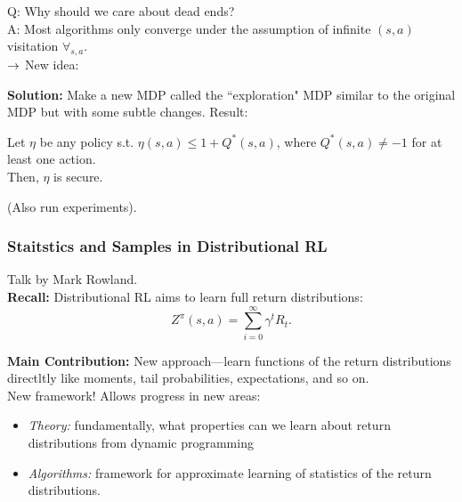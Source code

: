
Q: Why should we care about dead ends? \\

A: Most algorithms only converge under the assumption of infinite $(s,a)$ visitation $\forall_{s,a}$. \\

$\rightarrow$ New idea:

{\bf Solution:} Make a new MDP called the ``exploration" MDP similar to the original MDP but with some subtle changes. Result:
\begin{theorem}
Let $\eta$ be any policy s.t. $\eta(s,a) \leq 1+ Q^*(s,a)$, where $Q^*(s,a) \neq -1$ for at least one action. \\

Then, $\eta$ is secure.
\end{theorem}

(Also run experiments). \\


\spacerule
\subsubsection{Staitstics and Samples in Distributional RL}

Talk by Mark Rowland. \\

{\bf Recall:} Distributional RL aims to learn full return distributions:
\[
Z^{\pi}(s,a) = \sum_{i=0}^\infty \gamma^t R_t.
\]

{\bf Main Contribution:} New approach---learn functions of the return distributions directltly like moments, tail probabilities, expectations, and so on. \\

New framework! Allows progress in new areas:
\begin{itemize}
    \item {\it Theory:} fundamentally, what properties can we learn about return distributions from dynamic programming
    \item {\it Algorithms:} framework for approximate learning of statistics of the return distributions.
\end{itemize}


